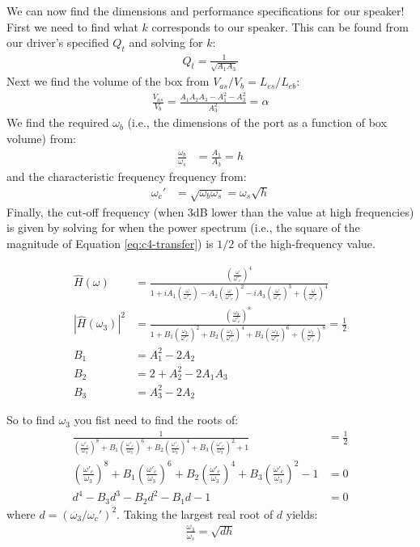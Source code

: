 \documentclass[10pt]{book}
\begin{document}
We can now find the dimensions and performance specifications for our speaker! First we need to find what $k$ corresponds to our speaker. This can be found from our driver's specified $Q_t$ and solving for $k$:
\begin{align}
Q_t=\frac{1}{\sqrt{A_1A_3}}
\end{align}
Next we find the volume of the box from $V_{as}/V_{b}=L_{es}/L_{eb}$:
\begin{align}
\frac{V_{as}}{V_{b}}=\frac{A_1A_2A_3-A_1^2-A_3^2}{A_3^2}=\alpha
\end{align}
We find the required $\omega_b$ (i.e., the dimensions of the port as a function of box volume) from:
\begin{align}
\frac{\omega_b}{\omega_s}&=\frac{A_1}{A_3}=h
\end{align}
and the characteristic frequency frequency from:
\begin{align}
\omega_c'&=\sqrt{\omega_b\omega_s}=\omega_s\sqrt{h}
\end{align}
Finally, the cut-off frequency (when 3dB lower than the value at high frequencies) is given by solving for when the power spectrum (i.e., the square of the magnitude of Equation \ref{eq:c4-transfer}) is $1/2$ of the high-frequency value.

\begin{align}
\hat{H}(\omega)&=\frac{\left(\frac{\omega}{\omega'_c}\right)^4}{1+iA_1 \left(\frac{\omega}{\omega'_c}\right)-A_2\left(\frac{\omega}{\omega'_c}\right)^2-iA_3\left(\frac{\omega}{\omega'_c}\right)^3+\left(\frac{\omega}{\omega'_c}\right)^4}\\
\left| \hat{H}(\omega_3) \right|^2 &=\frac{\left(\frac{\omega_3}{\omega'_c}\right)^8}{1+B_1 \left(\frac{\omega_3}{\omega'_c}\right)^2+B_2\left(\frac{\omega_3}{\omega'_c}\right)^4+B_3\left(\frac{\omega_3}{\omega'_c}\right)^6+\left(\frac{\omega_3}{\omega'_c}\right)^8}=\frac{1}{2}\\
B_1 &= A_1^2-2A_2\\
B_2 &= 2+A_2^2-2A_1A_3\\
B_3 &= A_3^2-2A_2
\end{align}

So to find $\omega_3$ you fist need to find the roots of:
\begin{align}
\frac{1}{\left(\frac{\omega'_c}{\omega_3}\right)^8+B_1 \left(\frac{\omega'_c}{\omega_3}\right)^6+B_2\left(\frac{\omega'_c}{\omega_3}\right)^4+B_3\left(\frac{\omega'_c}{\omega_3}\right)^2+1}&=\frac{1}{2}\\
\left(\frac{\omega'_c}{\omega_3}\right)^8+B_1 \left(\frac{\omega'_c}{\omega_3}\right)^6+B_2\left(\frac{\omega'_c}{\omega_3}\right)^4+B_3\left(\frac{\omega'_c}{\omega_3}\right)^2-1&=0\\
d^4-B_3 d^3- B_2 d^2 - B_1 d -1&=0
\end{align}
where $d=(\omega_3/\omega_c')^2$. Taking the largest real root of $d$ yields:
\begin{align}
\frac{\omega_3}{\omega_s}=\sqrt{dh}
\end{align}
\end{document}
